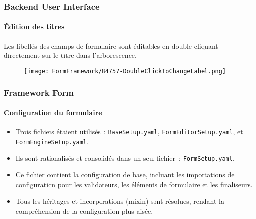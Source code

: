 
\begin{frame}[fragile]
	\frametitle{Backend User Interface}
	\framesubtitle{Édition des titres}

	Les libellés des champs de formulaire sont éditables en double-cliquant directement sur le titre dans l'arborescence.

	\begin{figure}
		\texttt{[image: FormFramework/84757-DoubleClickToChangeLabel.png]}
	\end{figure}

\end{frame}


\begin{frame}[fragile]
	\frametitle{Framework Form}
	\framesubtitle{Configuration du formulaire}

	\begin{itemize}
		\item Trois fichiers étaient utilisés~: \texttt{BaseSetup.yaml}, \texttt{FormEditorSetup.yaml}, et \texttt{FormEngineSetup.yaml}.
		\item Ils sont rationalisés et consolidés dans un seul fichier~: \texttt{FormSetup.yaml}.
		\item Ce fichier contient la configuration de base, incluant les importations de configuration pour les validateurs,
			les éléments de formulaire et les finaliseurs.
		\item Tous les héritages et incorporations (mixin) sont résolues, rendant la compréhension de la configuration plus aisée.
	\end{itemize}

\end{frame}


